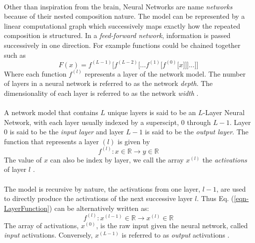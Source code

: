 \documentclass[12pt,letterpaper]{article}
\begin{document}
\paragraph*{}Other than inspiration from the brain, Neural Networks are name \textit{networks} because of their nested composition nature. The model can be represented by a linear computational graph which successively maps exactly how the repeated composition is structured. In a \textit{feed-forward network}, information is passed successively in one direction. For example functions could be chained together such as \cite{Goodfellow}
\begin{equation}
\label{eqn-FunctionChain}
F(x) = f^{(L-1)}\big[f^{(L-2)}\big[...f^{(1)}\big[f^{(0)}\big[x]\big]\big]...\big]\big]
\end{equation}
Where each function $f^{(l)}$ represents a layer of the network model. The number of layers in a neural network is referred to as the network \textit{depth}. The dimensionality of each layer is referred to as the network \textit{width} \cite{Geron,Loy}.

\paragraph*{}A network model that contains $L$ unique layers is said to be an $L$-Layer Neural Network, with each layer usually indexed by a superscipt, $0$ through $L-1$. Layer $0$ is said to be the \textit{input layer} and layer $L-1$ is said to be the \textit{output layer}. The function that represents a layer $(l)$ is given by 
\begin{equation}
\label{eqn-LayerFunction}
f^{(l)} : x \in \mathbb{R} \rightarrow y \in \mathbb{R}
\end{equation}
The value of $x$ can also be index by layer, we call the array $x^{(l)}$ the \textit{activations} of layer $l$ \cite{Goodfellow,Loy}. 

\paragraph*{}The model is recursive by nature, the activations from one layer, $l-1$, are used to directly produce the activations of the next successive layer $l$. Thus Eq. (\ref{eqn-LayerFunction}) can be alternatively written as:
\begin{equation}
\label{eqn-altLayerFunction}
f^{(l)} : x^{(l-1)} \in \mathbb{R} \rightarrow x^{(l)} \in \mathbb{R}
\end{equation}
The array of activations, $x^{(0)}$, is the raw input given the neural network, called \textit{input} activations. Conversely, $x^{(L-1)}$ is referred to as \textit{output} activations \cite{Geron,James,Loy}.
\end{document}
